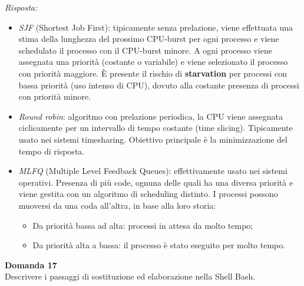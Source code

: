 \documentclass{article}
\newenvironment{problem}[2][Domanda]
    { \begin{mdframed}[backgroundcolor=gray!20] \textbf{#1 #2} \\}
    {  \end{mdframed}}
\newenvironment{solution}
    {\textit{Risposta:}}
    {}
\begin{document}
\begin{solution}
\begin{itemize}
    \item \emph{SJF} (Shortest Job First): tipicamente senza prelazione, viene effettuata una stima della lunghezza del prossimo CPU-burst per ogni processo e viene schedulato il processo con il CPU-burst minore.
    \newline
    A ogni processo viene assegnata una priorità (costante o variabile) e viene selezionato il processo con priorità maggiore.
    \newline
    È presente il rischio di \textbf{starvation} per processi con bassa priorità (uso intenso di CPU), dovuto alla costante presenza di processi con priorità minore.
    
    \item \emph{Round robin}: algoritmo con prelazione periodica, la CPU viene assegnata ciclicamente per un intervallo di tempo costante (time slicing).
    \newline
    Tipicamente usato nei sistemi timesharing.
    \newline
    Obiettivo principale è la minimizzazione del tempo di risposta.
    
    \item \emph{MLFQ} (Multiple Level Feedback Queues): effettivamente usato nei sistemi operativi.
    \newline
    Presenza di più code, ognuna delle quali ha una diversa priorità e viene gestita con un algoritmo di scheduling distinto.
    \newline
    I processi possono muoversi da una coda all’altra, in base alla loro storia:
    \begin{itemize}
        \item Da priorità bassa ad alta: processi in attesa da molto tempo;
        \item Da priorità alta a bassa: il processo è stato eseguito per molto tempo.
    \end{itemize}
\end{itemize} 
\end{solution}
\begin{problem}{17}
Descrivere i passaggi di sostituzione ed elaborazione nella Shell Bash.
\end{problem}
\end{document}

